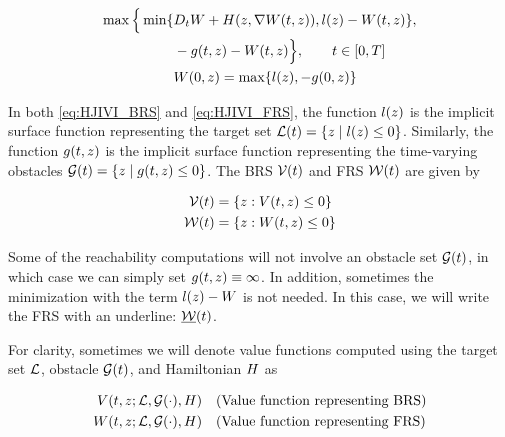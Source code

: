 \begin{equation}
\label{eq:HJIVI_FRS}
\begin{aligned}
\max \Big\{ \min \{&D_t \valfuncfwd + \ham(\state, \nabla \valfuncfwd(t, \state)), \ic(\state) - \valfuncfwd(t, \state) \}, \\
&-\obsfunc(t, \state) - \valfuncfwd(t, \state) \Big\}, \qquad t \in [0, T] \\
&\valfuncfwd(0, \state) = \max\{\fc(\state), -\obsfunc(0, \state)\}
\end{aligned}
\end{equation}

In both \eqref{eq:HJIVI_BRS} and \eqref{eq:HJIVI_FRS}, the function $l(z)$ is the implicit surface function representing the target set $\mathcal{L}(t) = \{z \mid l(z) \le 0\}$. Similarly, the function $g(t, z)$ is the implicit surface function representing the time-varying obstacles $\mathcal{G}(t) = \{z \mid g(t,z)\le 0\}$. The BRS $\mathcal{V}(t)$ and FRS $\mathcal{W}(t)$ are given by

\begin{equation}
\label{eq:implicitValfuncs}
\begin{aligned}
\brs(t) &= \{\state: \valfunc(t, \state) \le 0\} \\
\frs(t) &= \{\state: \valfuncfwd(t, \state) \le 0 \}
\end{aligned}
\end{equation}

Some of the reachability computations will not involve an obstacle set $\mathcal{G}(t)$, in which case we can simply set $g(t, z) \equiv \infty$. In addition, sometimes the minimization with the term $l(z) - W$ is not needed. In this case, we will write the FRS with an underline: $\underline {\mathcal{W}}(t)$.

 For clarity, sometimes we will denote value functions computed using the target set $\mathcal{L}$, obstacle $\mathcal{G}(t)$, and Hamiltonian $H$ as 

\begin{equation}
\begin{aligned}
V(t, z; \mathcal{L}, \mathcal{G}(\cdot), H) &\quad \text{(Value function representing BRS)} \\
W(t, z; \mathcal{L}, \mathcal{G}(\cdot), H) &\quad \text{(Value function representing FRS)}
\end{aligned}
\end{equation}

